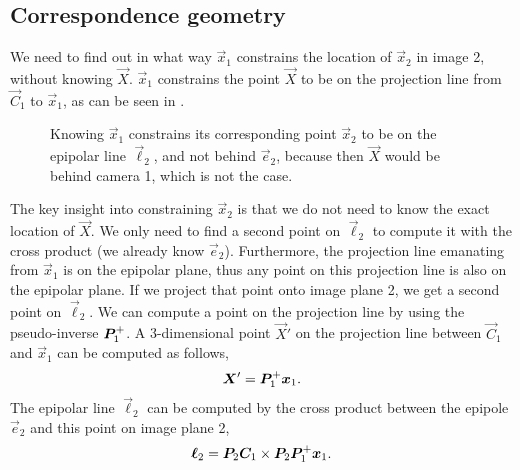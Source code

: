 \subsection{Correspondence geometry}

We need to find out in what way $\vec{x}_1$ constrains the location of
$\vec{x}_2$ in image 2, without knowing $\vec{X}$. $\vec{x}_1$ constrains the
point $\vec{X}$ to be on the projection line from $\vec{C}_1$ to $\vec{x}_1$,
as can be seen in .

\begin{figure}[ht]
    \centering
    \caption{Knowing $\vec{x}_1$ constrains its corresponding point $\vec{x}_2$
        to be on the epipolar line $\vec{\ell}_2$, and not behind $\vec{e}_2$,
        because then $\vec{X}$ would be behind camera 1, which is not the case.}
    \label{fig:image-1-constraint}
\end{figure}

The key insight into constraining $\vec{x}_2$ is that we do not need to know
the exact location of $\vec{X}$. We only need to find a second point on
$\vec{\ell}_2$ to compute it with the cross product (we already know
$\vec{e}_2$). Furthermore, the projection line emanating from $\vec{x}_1$ is on
the epipolar plane, thus any point on this projection line is also on the
epipolar plane. If we project that point onto image plane 2, we get a second
point on $\vec{\ell}_2$. We can compute a point on the projection line by using
the pseudo-inverse $\bm{P}_1^+$. A
3-dimensional point $\vec{X}'$ on the projection line between $\vec{C}_1$ and
$\vec{x}_1$ can be computed as follows, \[
    \bm{X}' = \bm{P}_1^+ \bm{x}_1.
\]
The epipolar line $\vec{\ell}_2$ can be computed by the cross product between
the epipole $\vec{e}_2$ and this point on image plane 2, \[
    \bm{\ell}_2 = \bm{P}_2 \bm{C}_1 \times \bm{P}_2 \bm{P}_1^+ \bm{x}_1.
\]


